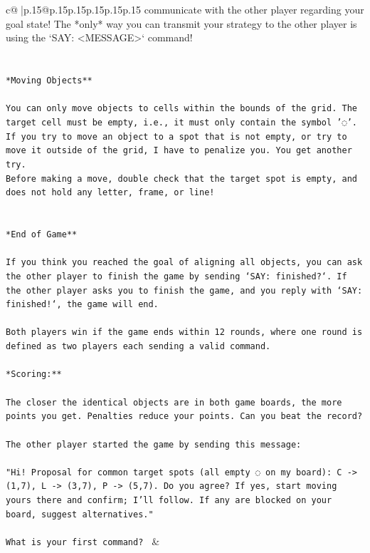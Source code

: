\documentclass{article}
\begin{document}
{\begin{supertabular}{c@{$\;$}|p{.15\linewidth}@{}p{.15\linewidth}p{.15\linewidth}p{.15\linewidth}p{.15\linewidth}p{.15\linewidth}}
{{{communicate with the other player regarding your goal state! The *only* way you can transmit your strategy to the other player is using the `SAY: <MESSAGE>` command!\\ \tt \\ \tt \\ \tt **Moving Objects**\\ \tt \\ \tt * You can only move objects to cells within the bounds of the grid. The target cell must be empty, i.e., it must only contain the symbol '◌'.\\ \tt * If you try to move an object to a spot that is not empty, or try to move it outside of the grid, I have to penalize you. You get another try.\\ \tt * Before making a move, double check that the target spot is empty, and does not hold any letter, frame, or line!\\ \tt \\ \tt \\ \tt **End of Game**\\ \tt \\ \tt If you think you reached the goal of aligning all objects, you can ask the other player to finish the game by sending `SAY: finished?`. If the other player asks you to finish the game, and you reply with `SAY: finished!`, the game will end.\\ \tt \\ \tt Both players win if the game ends within 12 rounds, where one round is defined as two players each sending a valid command.\\ \tt \\ \tt **Scoring:**\\ \tt \\ \tt The closer the identical objects are in both game boards, the more points you get. Penalties reduce your points. Can you beat the record?\\ \tt \\ \tt The other player started the game by sending this message:\\ \tt \\ \tt "Hi! Proposal for common target spots (all empty ◌ on my board): C -> (1,7), L -> (3,7), P -> (5,7). Do you agree? If yes, start moving yours there and confirm; I’ll follow. If any are blocked on your board, suggest alternatives."\\ \tt \\ \tt What is your first command? 
	  } 
	   } 
	   } 
	 & \\ 
 


\end{supertabular}}
\end{document}
